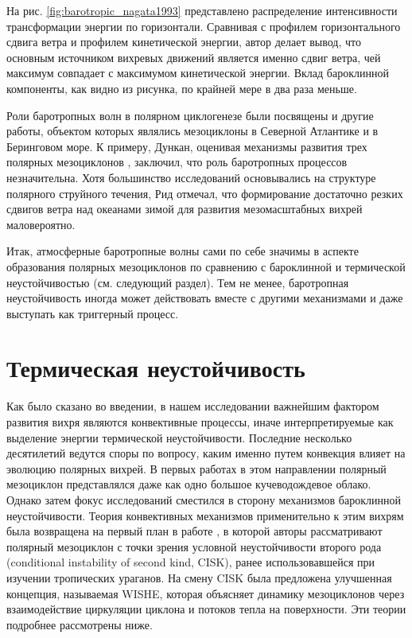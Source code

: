 На рис. \ref{fig:barotropic_nagata1993} представлено распределение интенсивности трансформации энергии по горизонтали. Сравнивая с профилем горизонтального сдвига ветра и профилем кинетической энергии, автор делает вывод, что основным источником вихревых движений является именно сдвиг ветра, чей максимум совпадает с максимумом кинетической энергии. Вклад бароклинной компоненты, как видно из рисунка, по крайней мере в два раза меньше.

Роли баротропных волн в полярном циклогенезе были посвящены и другие работы, объектом которых являлись мезоциклоны в Северной Атлантике и в Беринговом море. К примеру, Дункан, оценивая механизмы развития трех полярных мезоциклонов \citep{RT2003}, заключил, что роль баротропных процессов незначительна. Хотя большинство исследований основывались на структуре полярного струйного течения, Рид \citep{ReedDuncan1987} отмечал, что формирование достаточно резких сдвигов ветра над океанами зимой для развития мезомасштабных вихрей маловероятно.

Итак, атмосферные баротропные волны сами по себе значимы в аспекте образования полярных мезоциклонов по сравнению с бароклинной и термической неустойчивостью (см. следующий раздел). Тем не менее, баротропная неустойчивость иногда может действовать вместе с другими механизмами и даже выступать как триггерный процесс.

\section{Термическая неустойчивость}
\label{sec:theory:cisk_wishe}
Как было сказано во введении, в нашем исследовании важнейшим фактором развития вихря являются конвективные процессы, иначе интерпретируемые как выделение энергии термической неустойчивости. Последние несколько десятилетий ведутся споры по вопросу, каким именно путем конвекция влияет на эволюцию полярных вихрей. В первых работах в этом направлении полярный мезоциклон представлялся даже как одно большое кучеводождевое облако. Однако затем фокус исследований сместился в сторону механизмов бароклинной неустойчивости. Теория конвективных механизмов применительно к этим вихрям была возвращена на первый план в работе \citep{Okland1987,Rasmussen1979}, в которой авторы рассматривают полярный мезоциклон с точки зрения условной неустойчивости второго рода (conditional instability of second kind, CISK), ранее использовавшейся при изучении тропических ураганов. На смену CISK была предложена улучшенная концепция, называемая WISHE, которая объясняет динамику мезоциклонов через взаимодействие циркуляции циклона и потоков тепла на поверхности. Эти теории подробнее рассмотрены ниже.

